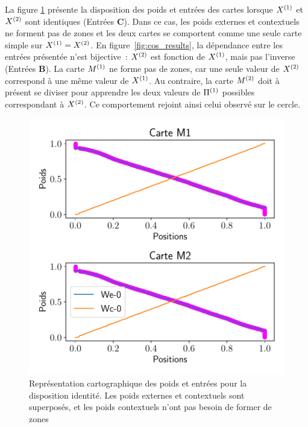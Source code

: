 \documentclass[../main]{subfiles}
\begin{document}
La figure \ref{fig:id_results} présente la disposition des poids et entrées des cartes lorsque $X^{({1})}$ et $X^{({2})}$ sont identiques (Entrées \textbf{C}).
Dans ce cas, les poids externes et contextuels ne forment pas de zones et les deux cartes se comportent comme une seule carte simple sur $X^{({1})} = X^{({2})}$. 
En figure~\ref{fig:cos_results}, la dépendance entre les entrées présentée n'est bijective~: $X^{({2})}$ est fonction de $X^{({1})}$, mais pas l'inverse (Entrées \textbf{B}). 
La carte $M^{({1})}$ ne forme pas de zones, car une seule valeur de $X^{({2})}$ correspond à une même valeur de $X^{({1})}$.
Au contraire, la carte $M^{({2})}$ doit à présent se diviser pour apprendre les deux valeurs de $\Pi^{({1})}$ possibles correspondant à $X^{({2})}$. 
Ce comportement rejoint ainsi celui observé sur le cercle.

\begin{figure}[h!]
	\centering\includegraphics[width=\textwidth]{2som_id_w.pdf}
	\caption{Représentation cartographique des poids et entrées pour la disposition identité. Les poids externes et contextuels sont superposés, et les poids contextuels n'ont pas besoin de former de zones \label{fig:id_results}}
	\end{figure}
	
\end{document}
